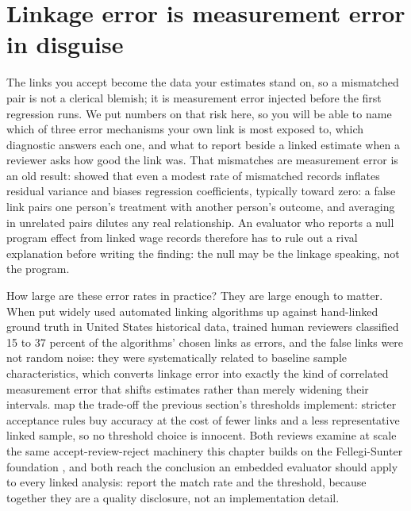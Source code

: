\documentclass[
    a4paper,
    fontsize=10pt,
    twoside=true,
    numbers=noenddot,
]{kaobook}
\begin{document}
\section{Linkage error is measurement error in disguise}\label{sec:ch06-linkerror}
The links you accept become the data your estimates stand on, so a mismatched pair is not a clerical blemish; it is measurement error injected before the first regression runs. We put numbers on that risk here, so you will be able to name which of three error mechanisms your own link is most exposed to, which diagnostic answers each one, and what to report beside a linked estimate when a reviewer asks how good the link was. That mismatches are measurement error is an old result: \textcite{neter1965mismatch} showed that even a modest rate of mismatched records inflates residual variance and biases regression coefficients, typically toward zero: a false link pairs one person's treatment with another person's outcome, and averaging in unrelated pairs dilutes any real relationship. An evaluator who reports a null program effect from linked wage records therefore has to rule out a rival explanation before writing the finding: the null may be the linkage speaking, not the program.

How large are these error rates in practice? They are large enough to matter. When \textcite{bailey2020linking} put widely used automated linking algorithms up against hand-linked ground truth in United States historical data, trained human reviewers classified 15 to 37 percent of the algorithms' chosen links as errors, and the false links were not random noise: they were systematically related to baseline sample characteristics, which converts linkage error into exactly the kind of correlated measurement error that shifts estimates rather than merely widening their intervals. \textcite{abramitzky2021linking} map the trade-off the previous section's thresholds implement: stricter acceptance rules buy accuracy at the cost of fewer links and a less representative linked sample, so no threshold choice is innocent. Both reviews examine at scale the same accept-review-reject machinery this chapter builds on the Fellegi-Sunter foundation \parencite{fellegi1969linkage}, and both reach the conclusion an embedded evaluator should apply to every linked analysis: report the match rate and the threshold, because together they are a quality disclosure, not an implementation detail.
\end{document}
